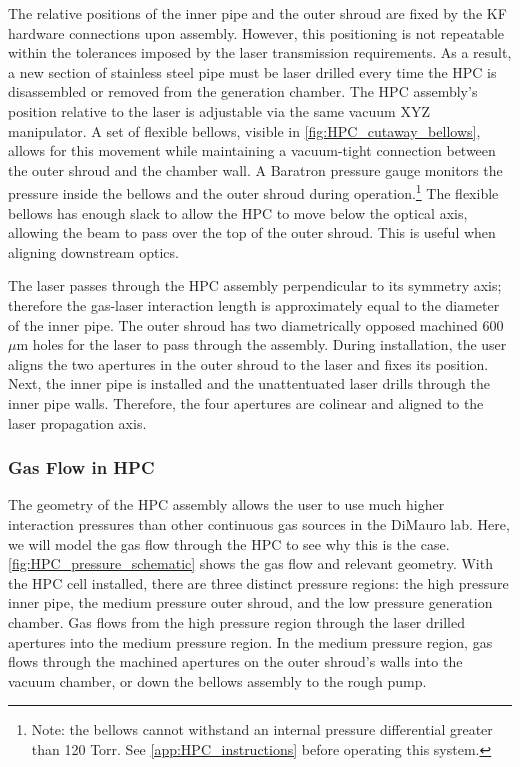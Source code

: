 The relative positions of the inner pipe and the outer shroud are fixed by the KF hardware connections upon assembly. However, this positioning is not repeatable within the tolerances imposed by the laser transmission requirements. As a result, a new section of stainless steel pipe must be laser drilled every time the HPC is disassembled or removed from the generation chamber. The HPC assembly's position relative to the laser is adjustable via the same vacuum XYZ manipulator. A set of flexible bellows, visible in \cref{fig:HPC_cutaway_bellows}, allows for this movement while maintaining a vacuum-tight connection between the outer shroud and the chamber wall. A Baratron pressure gauge monitors the pressure inside the bellows and the outer shroud during operation.\footnote{Note: the bellows cannot withstand an internal pressure differential greater than 120 Torr. See \cref{app:HPC_instructions} before operating this system.} The flexible bellows has enough slack to allow the HPC to move below the optical axis, allowing the beam to pass over the top of the outer shroud. This is useful when aligning downstream optics.

The laser passes through the HPC assembly perpendicular to its symmetry axis; therefore the gas-laser interaction length is approximately equal to the diameter of the inner pipe. The outer shroud has two diametrically opposed machined 600 $\mu$m holes for the laser to pass through the assembly. During installation, the user aligns the two apertures in the outer shroud to the laser and fixes its position. Next, the inner pipe is installed and the unattentuated laser drills through the inner pipe walls. Therefore, the four apertures are colinear and aligned to the laser propagation axis.

\subsubsection{Gas Flow in HPC}

The geometry of the HPC assembly allows the user to use much higher interaction pressures than other continuous gas sources in the DiMauro lab. Here, we will model the gas flow through the HPC to see why this is the case. \cref{fig:HPC_pressure_schematic} shows the gas flow and relevant geometry. With the HPC cell installed, there are three distinct pressure regions: the high pressure inner pipe, the medium pressure outer shroud, and the low pressure generation chamber. Gas flows from the high pressure region through the laser drilled apertures into the medium pressure region. In the medium pressure region, gas flows through the machined apertures on the outer shroud's walls into the vacuum chamber, or down the bellows assembly to the rough pump.

